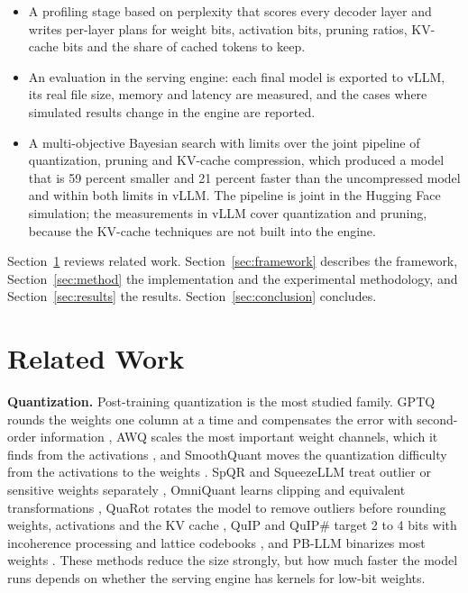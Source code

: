 \documentclass[num-refs]{wiley-article}
\begin{document}
\begin{itemize}
  \item A profiling stage based on perplexity that scores every decoder layer and writes per-layer plans for weight bits, activation bits, pruning ratios, KV-cache bits and the share of cached tokens to keep.
  \item An evaluation in the serving engine: each final model is exported to vLLM, its real file size, memory and latency are measured, and the cases where simulated results change in the engine are reported.
  \item A multi-objective Bayesian search with limits over the joint pipeline of quantization, pruning and KV-cache compression, which produced a model that is 59 percent smaller and 21 percent faster than the uncompressed model and within both limits in vLLM. The pipeline is joint in the Hugging Face simulation; the measurements in vLLM cover quantization and pruning, because the KV-cache techniques are not built into the engine.
\end{itemize}

Section~\ref{sec:related} reviews related work. Section~\ref{sec:framework} describes the framework, Section~\ref{sec:method} the implementation and the experimental methodology, and Section~\ref{sec:results} the results. Section~\ref{sec:conclusion} concludes.

\section{Related Work}
\label{sec:related}

\textbf{Quantization.} Post-training quantization is the most studied family. GPTQ rounds the weights one column at a time and compensates the error with second-order information \cite{frantar2023gptq}, AWQ scales the most important weight channels, which it finds from the activations \cite{lin2024awq}, and SmoothQuant moves the quantization difficulty from the activations to the weights \cite{xiao2023smoothquant}. SpQR and SqueezeLLM treat outlier or sensitive weights separately \cite{dettmers2024spqr,kim2024squeezellm}, OmniQuant learns clipping and equivalent transformations \cite{shao2024omniquant}, QuaRot rotates the model to remove outliers before rounding weights, activations and the KV cache \cite{ashkboos2024quarot}, QuIP and QuIP\# target 2 to 4 bits with incoherence processing and lattice codebooks \cite{chee2023quip,tseng2024quipsharp}, and PB-LLM binarizes most weights \cite{shang2023pbllm}. These methods reduce the size strongly, but how much faster the model runs depends on whether the serving engine has kernels for low-bit weights.
\end{document}
